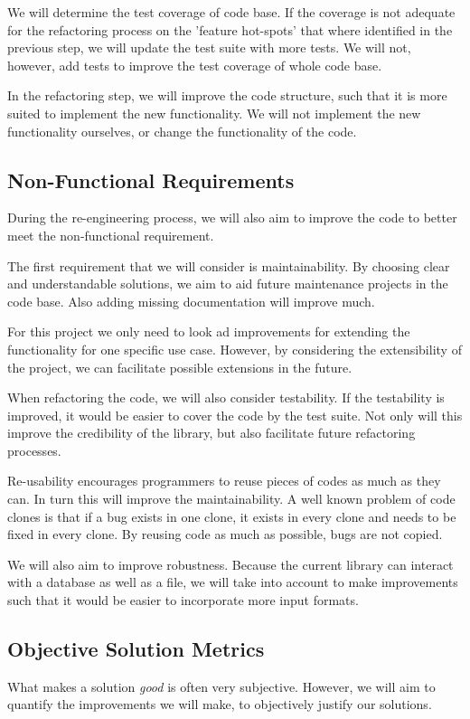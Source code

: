 \documentclass[]{article}
\begin{document}
We will determine the test coverage of code base. If the coverage is not adequate for the refactoring process on the 'feature hot-spots' that where identified in the previous step, we will update the test suite with more tests. We will not, however, add tests to improve the test coverage of whole code base.

In the refactoring step, we will improve the code structure, such that it is more suited to implement the new functionality. We will not implement the new functionality ourselves, or change the functionality of the code. 

\subsection{Non-Functional Requirements}
During the re-engineering process, we will also aim to improve the code to better meet the non-functional requirement. 

The first requirement that we will consider is maintainability. By choosing clear and understandable solutions, we aim to aid future maintenance projects in the code base. Also adding missing documentation will improve much.

For this project we only need to look ad improvements for extending the functionality for one specific use case. However, by considering the extensibility of the project, we can facilitate possible extensions in the future. 

When refactoring the code, we will also consider testability. If the testability is improved, it would be easier to cover the code by the test suite. Not only will this improve the credibility of the library, but also facilitate future refactoring processes. 

Re-usability encourages programmers to reuse pieces of codes as much as they can. In turn this will improve the maintainability. A well known problem of code clones is that if a bug exists in one clone, it exists in every clone and needs to be fixed in every clone. By reusing code as much as possible, bugs are not copied.

We will also aim to improve robustness. Because the current library can interact with a database as well as a file, we will take into account to make improvements such that it would be easier to incorporate more input formats.

\subsection{Objective Solution Metrics}
\label{sectionObjective}
What makes a solution \textit{good} is often very subjective. However, we will aim to quantify the improvements we will make, to objectively justify our solutions. 
\end{document}
